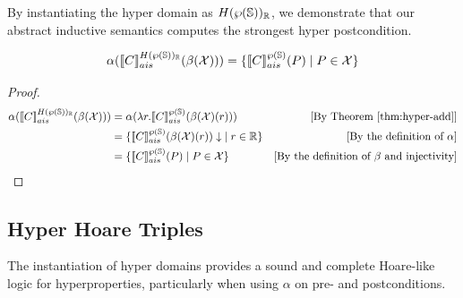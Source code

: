 \documentclass[
  10pt,       %
  twoside,    %
  a4paper,    %
  english,    %
  tikz,       %
  openright,  %
]{book}
\begin{document}
By instantiating the hyper domain as $H(\pow{\states})_{\mathbb{R}}$, we
demonstrate that our abstract inductive semantics computes the strongest hyper
postcondition.

\begin{theorem}
  \label{thm:hyperpost} 
  $$\alpha(\asem[H(\pow{\states})_\mathbb{R}]{C}(\beta(\mathcal{X}))) = \{ \asem[\pow{\states}]{C}(P) \mid P \in \mathcal{X} \}$$
\end{theorem}
\begin{proof}
  \begin{align*}
    \alpha(\asem[H(\pow{\states})_\mathbb{R}]{C}(\beta(\mathcal{X})))
      &= \alpha(\lambda r . \asem[\pow{\states}]{C}(\beta(\mathcal{X})(r)))
      &\text{[By Theorem \ref{thm:hyper-add}]} \\
      &= \{ \asem[\pow{\states}]{C}(\beta(\mathcal{X})(r))\downarrow \;
        \mid r \in \mathbb{R} \}
      &\text{[By the definition of $\alpha$]}\\
      &= \{ \asem[\pow{\states}]{C}(P) \mid P \in \mathcal{X} \}
      &\text{[By the definition of $\beta$ and injectivity]}\\
  \end{align*}
\end{proof}

\subsection{Hyper Hoare Triples}

The instantiation of hyper domains provides a sound and complete Hoare-like
logic for hyperproperties, particularly when using $\alpha$ on pre- and
postconditions.
\end{document}
